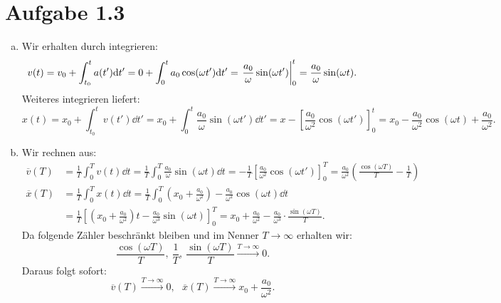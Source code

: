 \documentclass{theozettel}
\begin{document}
\newpage
\section*{Aufgabe 1.3}
\begin{enumerate}[(a)]
	\item 	Wir erhalten durch integrieren:
			\[
				v(t) = v_{0} + \int_{t_{0}}^{t} a(t')\dd t' = 0 + \int_{0}^{t} a_{0}\cos(\omega t') \dd t' = \eval{\frac{a_{0}}{\omega} \sin(\omega t')}_{0}^{t} = \frac{a_{0}}{\omega} \sin(\omega t).
			\]
			Weiteres integrieren liefert:
			\[
				x(t) = x_{0} + \int_{t_{0}}^{t} v(t') \dd t' = x_{0} + \int_{0}^{t} \frac{a_{0}}{\omega} \sin(\omega t') \dd t' = x - \left[ \frac{a_{0}}{\omega^{2}} \cos(\omega t') \right]_{0}^{t} = x_{0} - \frac{a_{0}}{\omega^{2}} \cos(\omega t) + \frac{a_{0}}{\omega^{2}}.
			\]
	
	\item 	Wir rechnen aus:
			\begin{align*}
				\overline{v}(T) &= \frac{1}{T} \int_{0}^{T} v(t) \dd t = \frac{1}{T} \int_{0}^{T} \frac{a_{0}}{\omega} \sin(\omega t) \dd t = -\frac{1}{T} \left[ \frac{a_{0}}{\omega^{2}} \cos(\omega t') \right]_{0}^{T} = \frac{a_{0}}{\omega^{2}} \left( \frac{\cos(\omega T)}{T} - \frac{1}{T} \right) \\
				\overline{x}(T) &= \frac{1}{T} \int_{0}^{T} x(t) \dd t = \frac{1}{T} \int_{0}^{T} \left(x_{0}+\frac{a_{0}}{\omega^{2}}\right) - \frac{a_{0}}{\omega^{2}}\cos(\omega t) \dd t \\
				&= \frac{1}{T} \left[\left(x_{0}+\frac{a_{0}}{\omega^{2}}\right)t - \frac{a_{0}}{\omega^{3}}\sin(\omega t) \right]_{0}^{T} = x_{0}+\frac{a_{0}}{\omega^{2}} - \frac{a_{0}}{\omega^{3} } \cdot \frac{\sin(\omega T)}{T}.
			\end{align*}
			Da folgende Zähler beschränkt bleiben und im Nenner $T \to \infty$ erhalten wir:
			\[
				\frac{\cos(\omega T)}{T}, \ \frac{1}{T}, \ \frac{\sin(\omega T)}{T} \stackrel{T \to \infty}{\longrightarrow} 0.
			\]
			Daraus folgt sofort:
			\[
				\overline{v}(T) \stackrel{T \to \infty}{\longrightarrow} 0, \ \ \ \overline{x}(T) \stackrel{T \to \infty}{\longrightarrow} x_{0}+\frac{a_{0}}{\omega^{2}}.
			\]
\end{enumerate}

\newpage
\end{document}
